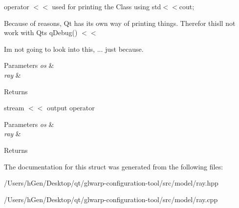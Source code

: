 operator $<$$<$ used for printing the Class using std$<$$<$cout; 

Because of reasons, Qt has its own way of printing things. Therefor this\textquotesingle{}ll not work with Qt\textquotesingle{}s q\+Debug() $<$$<$

I\textquotesingle{}m not going to look into this, ... just because.


\begin{DoxyParams}{Parameters}
{\em os} & \\
\hline
{\em ray} & \\
\hline
\end{DoxyParams}
\begin{DoxyReturn}{Returns}

\end{DoxyReturn}
stream $<$$<$ output operator 
\begin{DoxyParams}{Parameters}
{\em os} & \\
\hline
{\em ray} & \\
\hline
\end{DoxyParams}
\begin{DoxyReturn}{Returns}

\end{DoxyReturn}


The documentation for this struct was generated from the following files\+:\begin{DoxyCompactItemize}
\item 
/\+Users/h\+Gen/\+Desktop/qt/glwarp-\/configuration-\/tool/src/model/ray.\+hpp\item 
/\+Users/h\+Gen/\+Desktop/qt/glwarp-\/configuration-\/tool/src/model/ray.\+cpp\end{DoxyCompactItemize}
